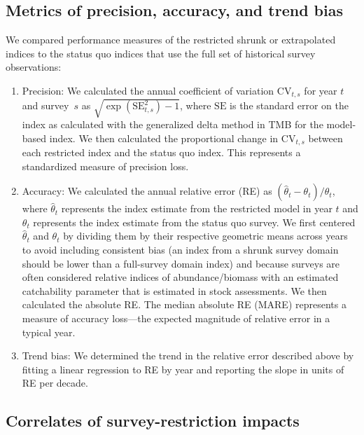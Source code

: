 \documentclass[12pt]{article}
\begin{document}
\subsection*{Metrics of precision, accuracy, and trend bias}

We compared performance measures of the restricted shrunk or extrapolated indices to the status quo indices that use the full set of historical survey observations:

\begin{enumerate}
  \item Precision: We calculated the annual coefficient of variation $\mathrm{CV}_{t,s}$ for year $t$ and survey~$s$ as $\sqrt{\exp(\mathrm{SE}_{t,s}^2) - 1}$, where $\mathrm{SE}$ is the standard error on the index as calculated with the generalized delta method in TMB \citep{kristensen2016} for the model-based index. We then calculated the proportional change in $\mathrm{CV}_{t,s}$ between each restricted index and the status quo index. This represents a standardized measure of precision loss.

    \item Accuracy: We calculated the annual relative error (RE) as $(\hat{\theta}_t - \theta_t) / \theta_t$, where $\hat{\theta}_t$ represents the index estimate from the restricted model in year $t$ and $\theta_t$ represents the index estimate from the status quo survey. We first centered $\hat{\theta}_t$ and $\theta_t$ by dividing them by their respective geometric means across years to avoid including consistent bias (an index from a shrunk survey domain should be lower than a full-survey domain index) and because surveys are often considered relative indices of abundance/biomass with an estimated catchability parameter that is estimated in stock assessments. We then calculated the absolute RE. The median absolute RE (MARE) represents a measure of accuracy loss---the expected magnitude of relative error in a typical year.

    \item Trend bias: We determined the trend in the relative error described above by fitting a linear regression to RE by year and reporting the slope in units of RE per decade.

\end{enumerate}

\subsection*{Correlates of survey-restriction impacts}
\end{document}
